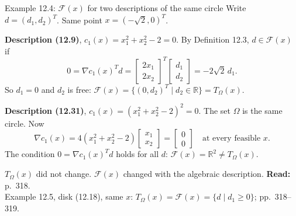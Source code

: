 \documentclass[aspectratio=169,12pt]{beamer}
\newcommand{\R}{\mathbb{R}}
\newcommand{\readbook}[1]{{\color{red}\textbf{Read:} #1}}
\newcommand{\cF}{\mathcal{F}}
\newcommand{\TO}{T_{\Omega}}
\begin{document}
\begin{frame}{Example 12.4: $\cF(x)$ for two descriptions of the same circle}
  Write $d=(d_{1},d_{2})^{T}$. Same point $x=(-\sqrt2,0)^{T}$.

  \textbf{Description (12.9)}, $c_{1}(x)=x_{1}^{2}+x_{2}^{2}-2=0$. By Definition 12.3, $d\in\cF(x)$ if
  \[ 0=\nabla c_{1}(x)^{T}d=\begin{bmatrix}2x_{1}\\2x_{2}\end{bmatrix}^{T}\begin{bmatrix}d_{1}\\d_{2}\end{bmatrix}=-2\sqrt2\,d_{1} . \]
  So $d_{1}=0$ and $d_{2}$ is free: $\cF(x)=\{(0,d_{2})^{T}\mid d_{2}\in\R\}=\TO(x)$.

  \vspace{0.2em}
  \textbf{Description (12.31)}, $c_{1}(x)=(x_{1}^{2}+x_{2}^{2}-2)^{2}=0$. The set $\Omega$ is the same circle. Now
  \[ \nabla c_{1}(x)=4(x_{1}^{2}+x_{2}^{2}-2)\begin{bmatrix}x_{1}\\x_{2}\end{bmatrix}=\begin{bmatrix}0\\0\end{bmatrix}
     \quad\text{at every feasible } x . \]
  The condition $0=\nabla c_{1}(x)^{T}d$ holds for all $d$: $\cF(x)=\R^{2}\ne\TO(x)$.

  $\TO(x)$ did not change. $\cF(x)$ changed with the algebraic description. \readbook{p.~318.}\\
  Example 12.5, disk (12.18), same $x$: $\TO(x)=\cF(x)=\{d\mid d_{1}\ge 0\}$; pp.~318--319.
\end{frame}
\end{document}

